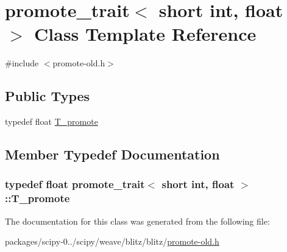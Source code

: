 \hypertarget{classpromote__trait_3_01short_01int_00_01float_01_4}{}\section{promote\+\_\+trait$<$ short int, float $>$ Class Template Reference}
\label{classpromote__trait_3_01short_01int_00_01float_01_4}


{\ttfamily \#include $<$promote-\/old.\+h$>$}

\subsection*{Public Types}
\begin{DoxyCompactItemize}
\item 
typedef float \hyperlink{classpromote__trait_3_01short_01int_00_01float_01_4_aaa4510d4267d64946bf73a1faaa3ef99}{T\+\_\+promote}
\end{DoxyCompactItemize}


\subsection{Member Typedef Documentation}
\hypertarget{classpromote__trait_3_01short_01int_00_01float_01_4_aaa4510d4267d64946bf73a1faaa3ef99}{}
\subsubsection[{T\+\_\+promote}]{\setlength{\rightskip}{0pt plus 5cm}typedef float {\bf promote\+\_\+trait}$<$ short int, float $>$\+::{\bf T\+\_\+promote}}\label{classpromote__trait_3_01short_01int_00_01float_01_4_aaa4510d4267d64946bf73a1faaa3ef99}


The documentation for this class was generated from the following file\+:\begin{DoxyCompactItemize}
\item 
packages/scipy-\/0../scipy/weave/blitz/blitz/\hyperlink{promote-old_8h}{promote-\/old.\+h}\end{DoxyCompactItemize}
